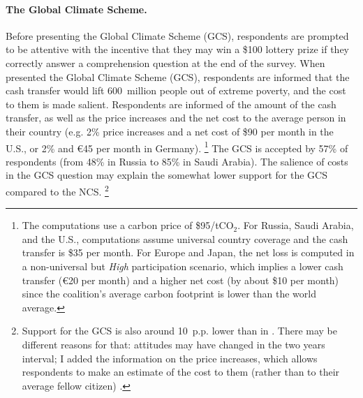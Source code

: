 \documentclass[12pt,english]{article}
\begin{document}
\begin{bibunit}
\paragraph{The Global Climate Scheme.} Before presenting the Global Climate Scheme (GCS), respondents are prompted to be attentive with the incentive that they may win a \$100 lottery prize if they correctly answer a comprehension question at the end of the survey. 
When presented the Global Climate Scheme (GCS), respondents are informed that the cash transfer would lift 600~million people out of extreme poverty, and the cost to them is made salient. Respondents are informed of the amount of the cash transfer, as well as the price increases and the net cost to the average person in their country (e.g. 2\% price increases and a net cost of \$90 per month in the U.S., or 2\% and \euro{}45 per month in Germany).%
\footnote{The computations use a carbon price of \$95/tCO$_\text{2}$. For Russia, Saudi Arabia, and the U.S., computations assume universal country coverage and the cash transfer is \$35 per month. 
For Europe and Japan, the net loss is computed in a non-universal but \textit{High} participation scenario, which implies a lower cash transfer (\euro{}20 per month) and a higher net cost (by about \$10 per month) since the coalition's average carbon footprint is lower than the world average.} 
The GCS is accepted by 57\% of respondents (from 48\% in Russia to 85\% in Saudi Arabia). The salience of costs in the GCS question may explain the somewhat lower support for the GCS compared to the NCS.%
\footnote{Support for the GCS is also around 10~p.p. lower than in \citep{fabre_majority_2025}. There may be different reasons for that: attitudes may have changed in the two years interval; I added the information on the price increases, which allows respondents to make an estimate of the cost to them (rather than to their average fellow citizen)%
.} 


\end{bibunit}
\end{document}
